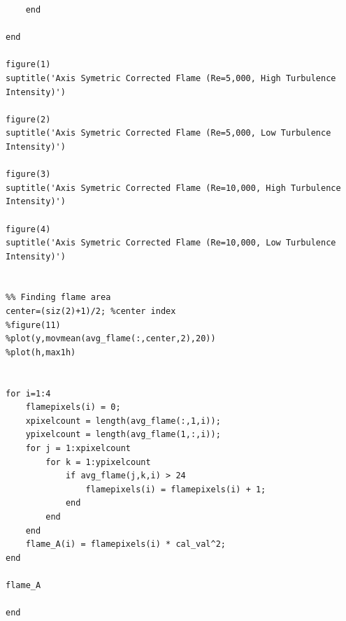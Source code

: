 \documentclass[12pt]{ussci} %
\begin{document}
\begin{appendices}
\begin{verbatim}
    end
    
end

figure(1)
suptitle('Axis Symetric Corrected Flame (Re=5,000, High Turbulence Intensity)')

figure(2)
suptitle('Axis Symetric Corrected Flame (Re=5,000, Low Turbulence Intensity)')

figure(3)
suptitle('Axis Symetric Corrected Flame (Re=10,000, High Turbulence Intensity)')

figure(4)
suptitle('Axis Symetric Corrected Flame (Re=10,000, Low Turbulence Intensity)')


%% Finding flame area
center=(siz(2)+1)/2; %center index
%figure(11)
%plot(y,movmean(avg_flame(:,center,2),20))
%plot(h,max1h)


for i=1:4
    flamepixels(i) = 0;
    xpixelcount = length(avg_flame(:,1,i));
    ypixelcount = length(avg_flame(1,:,i));
    for j = 1:xpixelcount
        for k = 1:ypixelcount
            if avg_flame(j,k,i) > 24
                flamepixels(i) = flamepixels(i) + 1;
            end
        end
    end
    flame_A(i) = flamepixels(i) * cal_val^2;
end

flame_A

end
\end{verbatim}
\endgroup


\end{appendices}
\end{document}
